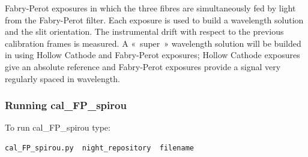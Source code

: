 Fabry-Perot exposures in which the three fibres are simultaneously fed by light from the Fabry-Perot filter. Each exposure is used to build a wavelength solution and the slit orientation. The instrumental drift with respect to the previous calibration frames is measured. A « super » wavelength solution will be builded in using Hollow Cathode and Fabry-Perot exposures; Hollow Cathode exposures give an absolute reference and Fabry-Perot exposures provide a signal very regularly spaced  in wavelength.

\subsubsection{Running cal\_FP\_spirou}

To run cal\_FP\_spirou type:
\begin{lstlisting}[language=bash, style=bashstyle]
cal_FP_spirou.py  night_repository  filename
\end{lstlisting}
